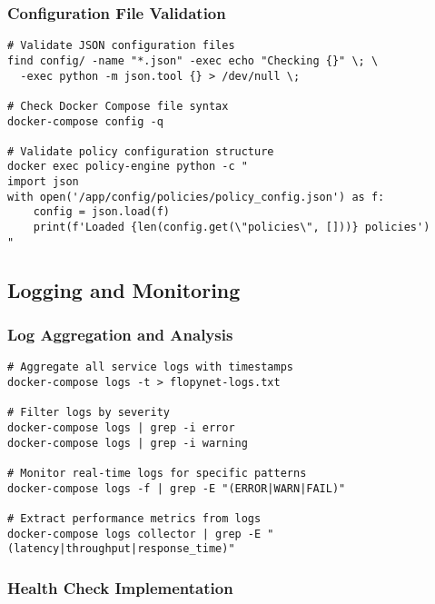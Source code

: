 \subsubsection{Configuration File Validation}

\begin{lstlisting}[style=bashcode, caption=Configuration Validation]
# Validate JSON configuration files
find config/ -name "*.json" -exec echo "Checking {}" \; \
  -exec python -m json.tool {} > /dev/null \;

# Check Docker Compose file syntax
docker-compose config -q

# Validate policy configuration structure
docker exec policy-engine python -c "
import json
with open('/app/config/policies/policy_config.json') as f:
    config = json.load(f)
    print(f'Loaded {len(config.get(\"policies\", []))} policies')
"
\end{lstlisting}

\subsection{Logging and Monitoring}

\subsubsection{Log Aggregation and Analysis}

\begin{lstlisting}[style=bashcode, caption=Log Analysis Tools]
# Aggregate all service logs with timestamps
docker-compose logs -t > flopynet-logs.txt

# Filter logs by severity
docker-compose logs | grep -i error
docker-compose logs | grep -i warning

# Monitor real-time logs for specific patterns
docker-compose logs -f | grep -E "(ERROR|WARN|FAIL)"

# Extract performance metrics from logs
docker-compose logs collector | grep -E "(latency|throughput|response_time)"
\end{lstlisting}

\subsubsection{Health Check Implementation}

